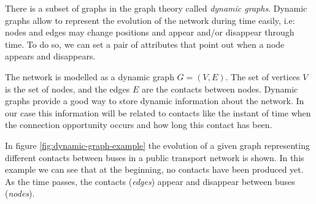There is a subset of graphs in the graph theory called \textit{dynamic graphs}. Dynamic graphs allow to represent the evolution of the network during time easily, i.e: nodes and edges may change positions and appear and/or disappear through time. To do so, we can set a pair of attributes that point out when a node appears and disappears.

The network is modelled as a dynamic graph $G=(V,E)$. The set of vertices $V$ is the set of nodes, and the edges $E$ are the contacts between nodes. Dynamic graphs provide a good way to store dynamic information about the network. In our case this information will be related to contacts like the instant of time when the connection opportunity occurs and how long this contact has been.

In figure \ref{fig:dynamic-graph-example} the evolution of a given graph representing different contacts between buses in a public transport network is shown. In this example we can see that at the beginning, no contacts have been produced yet. As the time passes, the contacts (\textit{edges}) appear and disappear between buses (\textit{nodes}). 

